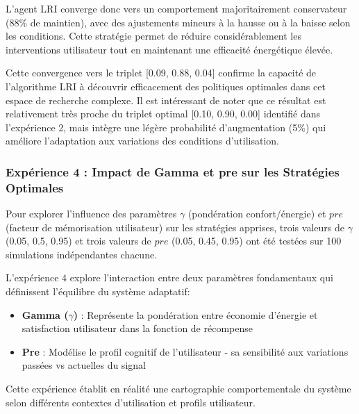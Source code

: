 \documentclass[a4paper,11pt]{article}
\begin{document}
L'agent LRI converge donc vers un comportement majoritairement conservateur (88\% de maintien), avec des ajustements mineurs à la hausse ou à la baisse selon les conditions. Cette stratégie permet de réduire considérablement les interventions utilisateur tout en maintenant une efficacité énergétique élevée.


Cette convergence vers le triplet [0.09, 0.88, 0.04] confirme la capacité de l'algorithme LRI à découvrir efficacement des politiques optimales dans cet espace de recherche complexe. Il est intéressant de noter que ce résultat est relativement très proche du triplet optimal [0.10, 0.90, 0.00] identifié dans l'expérience 2, mais intègre une légère probabilité d'augmentation (5\%) qui améliore l'adaptation aux variations des conditions d'utilisation.

\subsubsection{Expérience 4 : Impact de Gamma et pre sur les Stratégies Optimales}

Pour explorer l'influence des paramètres $\gamma$ (pondération confort/énergie) et $pre$ (facteur de mémorisation utilisateur) sur les stratégies apprises, trois valeurs de $\gamma$ (0.05, 0.5, 0.95) et trois valeurs de $pre$ (0.05, 0.45, 0.95) ont été testées sur 100 simulations indépendantes chacune.

L'expérience 4 explore l'interaction entre deux paramètres fondamentaux qui définissent l'équilibre du système adaptatif:

\begin{itemize}
    \item \textbf{Gamma ($\gamma$)} : Représente la pondération entre économie d'énergie et satisfaction utilisateur dans la fonction de récompense
    \item \textbf{Pre} : Modélise le profil cognitif de l'utilisateur - sa sensibilité aux variations passées vs actuelles du signal
\end{itemize}

Cette expérience établit en réalité une cartographie comportementale du système selon différents contextes d'utilisation et profils utilisateur.
\end{document}
